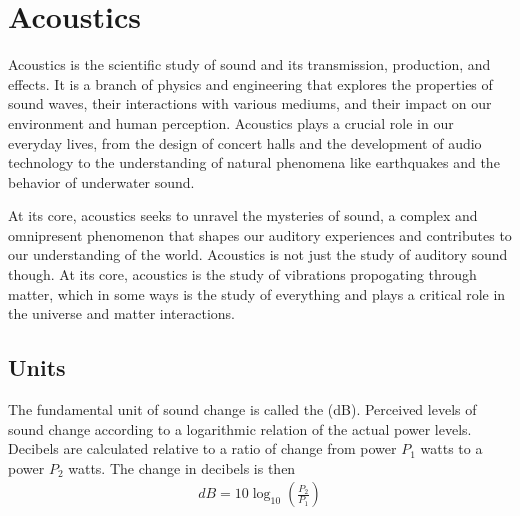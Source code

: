 \chapter{Acoustics}
\thispagestyle{fancy}

Acoustics is the scientific study of sound and its transmission, production, and effects. It is a branch of physics and engineering that explores the properties of sound waves, their interactions with various mediums, and their impact on our environment and human perception. Acoustics plays a crucial role in our everyday lives, from the design of concert halls and the development of audio technology to the understanding of natural phenomena like earthquakes and the behavior of underwater sound.

At its core, acoustics seeks to unravel the mysteries of sound, a complex and omnipresent phenomenon that shapes our auditory experiences and contributes to our understanding of the world. Acoustics is not just the study of auditory sound though. At its core, acoustics is the study of vibrations propogating through matter, which in some ways is the study of everything and plays a critical role in the universe and matter interactions.

\section{Units}

The fundamental unit of sound change is called the  (dB). Perceived levels of sound change according to a logarithmic relation of the actual power levels. Decibels are calculated relative to a ratio of change from power $P_1$ watts to a power $P_2$ watts. The change in decibels is then
\begin{align}
dB = 10 \log_{10}\left(\frac{P_2}{P_1}\right)
\end{align}
